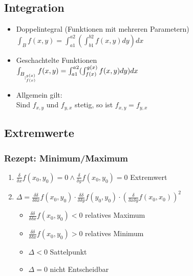 \subsection{Integration}
\begin{itemize}
	\item Doppelintegral (Funktionen mit mehreren Parametern) \\
	$\int_B f(x, y) = \int_{a1}^{a2}(\int_{b1}^{b2} f(x, y) dy) dx$

	\item Geschachtelte Funktionen \\
	$\int_{B_{\arrowvert_{f(x)}^{g(x)}}} f(x, y) = \int_{a1}^{a2}(\int_{f(x)}^{g(x)} f(x, y) dy) dx$

	\item Allgemein gilt: \\
	Sind $f_{x,y}$ und $f_{y,x}$ stetig, so ist $f_{x,y} = f_{y,x}$
\end{itemize}

\subsection{Extremwerte}
\subsubsection{Rezept: Minimum/Maximum}
\begin{enumerate}
	\item $\frac{\delta}{\delta x}f(x_0,y_0) = 0 \wedge \frac{\delta}{\delta y}f(x_0,y_0) = 0$ Extremwert

	\item $\Delta = \frac{\delta \delta}{\delta \delta x}f(x_0,y_0) \cdot \frac{\delta \delta}{\delta \delta y}f(y_0,y_0) \cdot (\frac{\delta}{\delta x \delta y}f(x_0,x_0))^2$
	\begin{itemize}
		\item $\frac{\delta \delta}{\delta \delta x}f(x_0,y_0) < 0$ relatives Maximum
		\item $\frac{\delta \delta}{\delta \delta x}f(x_0,y_0) > 0$ relatives Minimum
		\item $\Delta < 0$ Sattelpunkt
		\item $\Delta = 0$ nicht Entscheidbar
	\end{itemize}
\end{enumerate}
